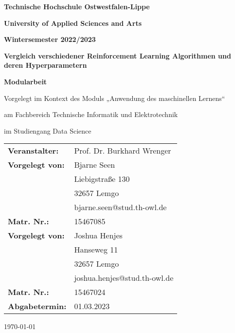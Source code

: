 \documentclass[../documentation.tex]{subfiles}
\begin{document}
\begin{titlepage}
    \begin{center}   
    {\textbf{Technische Hochschule Ostwestfalen-Lippe}}\\
    {\textbf{University of Applied Sciences and Arts}\par}\vspace{1.5cm}
    {\Large\bfseries Wintersemester 2022/2023\par}\vspace{1.5cm}
    {\huge\bfseries Vergleich verschiedener Reinforcement Learning Algorithmen und deren Hyperparametern \par}
    \vspace{1.5cm}
    {\Large\bfseries Modularbeit}\\
    {\large Vorgelegt im Kontext des Moduls „Anwendung des maschinellen Lernens“\par} \vspace{1cm}
    {\large am Fachbereich Technische Informatik und Elektrotechnik}\\
    {\large im Studiengang Data Science\par} \vspace{2cm}
    \end{center}
    \vfill
    \begin{tabular}{l l}
    \textbf{Veranstalter:}& {Prof. Dr. Burkhard Wrenger}\\ 
    \textbf{Vorgelegt von:}& {Bjarne Seen}\\ 
    \textbf{} & {Liebigstraße 130} \\
    \textbf{} & {32657 Lemgo} \\
    \textbf{} & {bjarne.seen@stud.th-owl.de} \\
    \textbf{Matr. Nr.:} & {15467085} \\
    \textbf{Vorgelegt von:}& {Joshua Henjes}\\ 
    \textbf{} & {Hanseweg 11} \\
    \textbf{} & {32657 Lemgo} \\
    \textbf{} & {joshua.henjes@stud.th-owl.de} \\
    \textbf{Matr. Nr.:} & {15467024} \\
    \textbf{Abgabetermin:} & {01.03.2023} 
    \end{tabular}   
    \begin{center}
    \vfill

    {\large\today\par}
    \end{center}
\end{titlepage}
\end{document}
